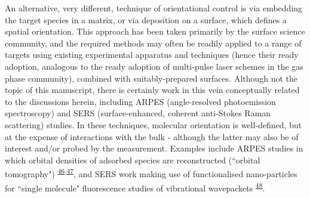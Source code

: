 \documentclass[10pt]{article}
\begin{document}
An alternative, very different, technique of orientational control is via embedding the target species in a matrix, or via deposition on a surface, which defines a spatial orientation. This approach has been taken primarily by the surface science community, and the required methods may often be readily applied to a range of targets using existing experimental apparatus and techniques (hence their ready adoption, analogous to the ready adoption of multi-pulse laser schemes in the gas phase community), combined with suitably-prepared surfaces. Although not the topic of this manuscript, there is certainly work in this vein conceptually related to the discussions herein, including ARPES (angle-resolved photoemission spectroscopy) and SERS (surface-enhanced, coherent anti-Stokes Raman scattering) studies. In these techniques, molecular orientation is well-defined, but at the expense of interactions with the bulk - although the latter may also be of interest and/or probed by the measurement. 
Examples include ARPES studies in which orbital densities of adsorbed species are reconstructed (``orbital tomography") \textsuperscript{\hyperref[csl:46]{46},\hyperref[csl:47]{47}}, and SERS work making use of functionalised nano-particles for ``single molecule" fluorescence studies of vibrational wavepackets \textsuperscript{\hyperref[csl:48]{48}}. 




\end{document}
